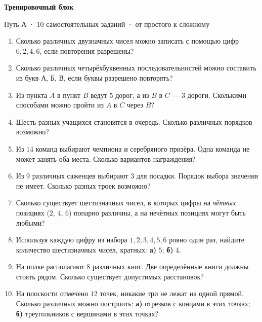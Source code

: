 \documentclass[a4paper,12pt]{article}
\begin{document}
\begin{center}
{\Large\bfseries\color{darkaccent}Тренировочный блок}\par
{\small\color{quiet}Путь А · 10 самостоятельных заданий · от простого к сложному}
\end{center}
\vspace{3mm}
\begin{enumerate}[label=\textbf{\arabic*.},leftmargin=8mm,itemsep=5.2mm]
\item Сколько различных двузначных чисел можно записать с помощью цифр $0,2,4,6$, если повторения разрешены?
\item Сколько различных четырёхбуквенных последовательностей можно составить из букв А, Б, В, если буквы разрешено повторять?
\item Из пункта $A$ в пункт $B$ ведут $5$ дорог, а из $B$ в $C$ --- $3$ дороги. Сколькими способами можно пройти из $A$ в $C$ через $B$?
\item Шесть разных учащихся становятся в очередь. Сколько различных порядков возможно?
\item Из $14$ команд выбирают чемпиона и серебряного призёра. Одна команда не может занять оба места. Сколько вариантов награждения?
\item Из $9$ различных саженцев выбирают $3$ для посадки. Порядок выбора значения не имеет. Сколько разных троек возможно?
\item Сколько существует шестизначных чисел, в которых цифры на \emph{чётных} позициях ($2$, $4$, $6$) попарно различны, а на нечётных позициях могут быть любыми?
\item Используя каждую цифру из набора $1,2,3,4,5,6$ ровно один раз, найдите количество шестизначных чисел, кратных: \textbf{а)} $5$; \textbf{б)} $4$.
\item На полке располагают $8$ различных книг. Две определённые книги должны стоять рядом. Сколько существует допустимых расстановок?
\item На плоскости отмечено $12$ точек, никакие три не лежат на одной прямой. Сколько различных можно построить: \textbf{а)} отрезков с концами в этих точках; \textbf{б)} треугольников с вершинами в этих точках?
\end{enumerate}
\clearpage
\end{document}

